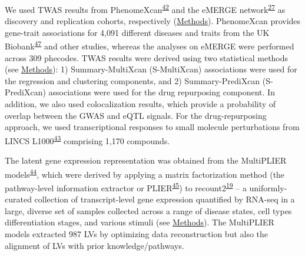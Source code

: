 \documentclass[
  a4paper,
]{article}
\begin{document}
We used TWAS results from PhenomeXcan\textsuperscript{\protect\hyperlink{ref-lY5ln3dB}{42}} and the eMERGE network\textsuperscript{\protect\hyperlink{ref-gZAOkumx}{27}} as discovery and replication cohorts, respectively (\protect\hyperlink{sec:methods:twas}{Methods}).
PhenomeXcan provides gene-trait associations for 4,091 different diseases and traits from the UK Biobank\textsuperscript{\protect\hyperlink{ref-nmJxPpE5}{47}} and other studies, whereas the analyses on eMERGE were performed across 309 phecodes.
TWAS results were derived using two statistical methods (see \protect\hyperlink{sec:methods:predixcan}{Methods}):
1) Summary-MultiXcan (S-MultiXcan) associations were used for the regression and clustering components,
and 2) Summary-PrediXcan (S-PrediXcan) associations were used for the drug repurposing component.
In addition, we also used colocalization results, which provide a probability of overlap between the GWAS and eQTL signals.
For the drug-repurposing approach, we used transcriptional responses to small molecule perturbations from LINCS L1000\textsuperscript{\protect\hyperlink{ref-F7lIlh2N}{43}} comprising 1,170 compounds.

The latent gene expression representation was obtained from the MultiPLIER models\textsuperscript{\protect\hyperlink{ref-14rnBunuZ}{44}}, which were derived by applying a matrix factorization method (the pathway-level information extractor or PLIER\textsuperscript{\protect\hyperlink{ref-Ki2ij7zE}{45}}) to recount2\textsuperscript{\protect\hyperlink{ref-6SPTvFXq}{19}} -- a uniformly-curated collection of transcript-level gene expression quantified by RNA-seq in a large, diverse set of samples collected across a range of disease states, cell types differentiation stages, and various stimuli (see \protect\hyperlink{sec:methods:multiplier}{Methods}).
The MultiPLIER models extracted 987 LVs by optimizing data reconstruction but also the alignment of LVs with prior knowledge/pathways.
\end{document}
